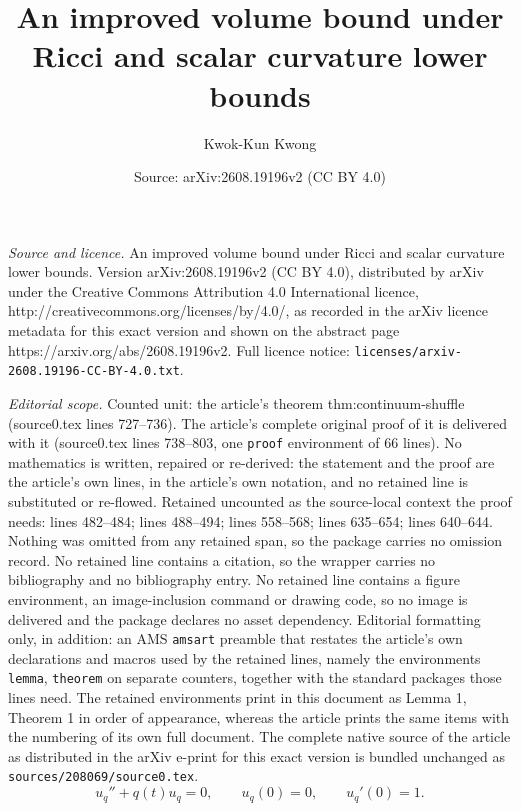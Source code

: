 \documentclass[10pt,a4paper]{amsart}
\title{An improved volume bound under Ricci and scalar curvature lower bounds}
\author{Kwok-Kun Kwong}
\date{Source: arXiv:2608.19196v2 (CC BY 4.0)}
\begin{document}
\maketitle

\noindent\emph{Source and licence.} An improved volume bound under Ricci and scalar curvature lower bounds. Version arXiv:2608.19196v2 (CC BY 4.0), distributed by arXiv under the Creative Commons Attribution 4.0 International licence, http://creativecommons.org/licenses/by/4.0/, as recorded in the arXiv licence metadata for this exact version and shown on the abstract page https://arxiv.org/abs/2608.19196v2. Full licence notice: \texttt{licenses/arxiv-2608.19196-CC-BY-4.0.txt}.\par\smallskip

\noindent\textit{Editorial scope.} Counted unit: the article's theorem thm:continuum-shuffle (source0.tex lines 727--736). The article's complete original proof of it is delivered with it (source0.tex lines 738--803, one \texttt{proof} environment of 66 lines). No mathematics is written, repaired or re-derived: the statement and the proof are the article's own lines, in the article's own notation, and no retained line is substituted or re-flowed.  Retained uncounted as the source-local context the proof needs: lines 482--484; lines 488--494; lines 558--568; lines 635--654; lines 640--644.  Nothing was omitted from any retained span, so the package carries no omission record.  No retained line contains a citation, so the wrapper carries no bibliography and no bibliography entry.  No retained line contains a figure environment, an image-inclusion command or drawing code, so no image is delivered and the package declares no asset dependency.  Editorial formatting only, in addition: an AMS \texttt{amsart} preamble that restates the article's own declarations and macros used by the retained lines, namely the environments \texttt{lemma}, \texttt{theorem} on separate counters, together with the standard packages those lines need.  The retained environments print in this document as Lemma 1, Theorem 1 in order of appearance, whereas the article prints the same items with the numbering of its own full document.  The complete native source of the article as distributed in the arXiv e-print for this exact version is bundled unchanged as \texttt{sources/208069/source0.tex}.
\begin{equation}\label{eq:ordinary-scalar-jacobi}
u_q''+q(t)u_q=0, \qquad u_q(0)=0, \qquad u_q'(0)=1.
\end{equation}
\end{document}
